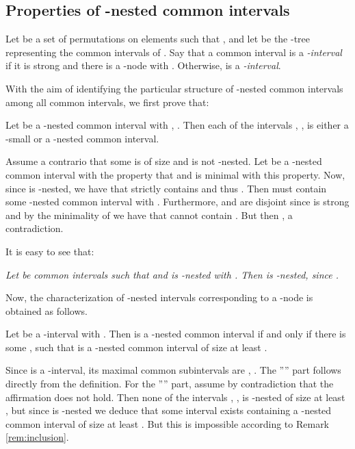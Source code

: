 \documentclass{article}
\begin{document}
\subsection{Properties of -nested common intervals}\label{sect:main}

Let  be a set of permutations on  elements such that , and
let  be the -tree representing the common intervals of .
Say that a common interval  is a {\em -interval} if it is strong and there is a -node  with . 
Otherwise,  is a  {\em -interval}.

With the aim of identifying the particular structure of -nested common  intervals
among all common  intervals, we first prove that:

\begin{lemma}\label{lemma:nonnested}
Let  be a -nested common  interval with , . Then each of the intervals , ,  is either a -small 
or a -nested common interval.
\end{lemma}
\begin{preuve}
Assume a contrario that some  is of size  and is not -nested. 
Let  be a -nested common  interval with the property 
that  and  is minimal with this property. Now,
since  is -nested, we have that  strictly contains  and thus
. Then  must contain some -nested common  interval  with
 . Furthermore,  and  are disjoint since  is strong
 and by the minimality of 
we have that  cannot contain . But then ,
a contradiction.
\end{preuve}

It is easy to see that:

\begin{remark}\label{rem:inclusion}
{\em Let  be common  intervals such that  and
 is -nested with . Then   is -nested, since
.}
\end{remark}

Now, the characterization of -nested intervals corresponding to a -node is obtained as follows.

\begin{lemma}\label{lemma:round}
 Let  be a -interval with . Then  is a -nested common 
 interval if and only if there is some , such that  is
a -nested common  interval of size at least .
\end{lemma}

\begin{preuve}
Since  is a -interval, its maximal common  subintervals are ,
. The '''' part  follows directly from the definition. For the
'''' part, assume by contradiction that the affirmation does not hold. Then none of 
the intervals , , is -nested of size at least , but 
since  is -nested we deduce that some interval  exists
containing a -nested common  interval  of size at least . But
this is impossible according to Remark \ref{rem:inclusion}.
\end{preuve}
\end{document}
